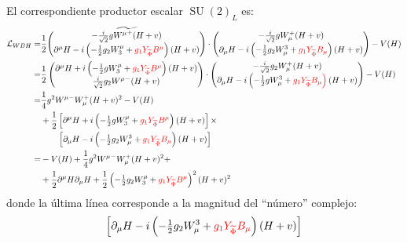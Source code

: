 \begin{frame}
El correspondiente productor escalar $\operatorname{\operatorname{SU}}(2)_L$ es:
\begin{align}
  \mathcal{L}_{WBH}=&\frac{1}{2}\widetilde{\begin{pmatrix}
    -\frac{i}{\sqrt{2}}g{W^\mu}^+(H+v)\\
    \partial^\mu H-i\left(-\frac{1}{2}g_2 W_3^\mu+{\color{red}{g_1}Y_{\widetilde{\Phi}} B^\mu}\right)(H+v)
  \end{pmatrix}}\cdot
   \begin{pmatrix}
    -\frac{i}{\sqrt{2}}gW_\mu^+(H+v)\\
    \partial_\mu H-i\left(-\frac{1}{2}g_2 W^3_\mu+{\color{red}{g_1}Y_{\widetilde{\Phi}} B_\mu}\right)(H+v)
  \end{pmatrix}-V(H)\nonumber\\
=&\frac{1}{2}\begin{pmatrix}
    \partial^\mu H+i\left(-\frac{1}{2}gW_3^\mu+{\color{red}{g_1}Y_{\widetilde{\Phi}} B^\mu}\right)(H+v)\\
    \frac{i}{\sqrt{2}}g_2{W^\mu}^-(H+v)\\
  \end{pmatrix}\cdot
  \begin{pmatrix}
    -\frac{i}{\sqrt{2}}g_2 W_\mu^+(H+v)\\
    \partial_\mu H-i\left(-\frac{1}{2}gW^3_\mu+\color{red}{g_1 Y_{\widetilde{\Phi}} B_\mu}\right)(H+v)
  \end{pmatrix}-V(H)\nonumber\\
  =&\frac{1}{4}g^2{W^\mu}^-W_\mu^+(H+v)^2-V(H)\nonumber\\
  &+\frac{1}{2}\left[\partial^\mu H+i\left(-\tfrac{1}{2}gW_3^\mu+{\color{red}{g_1}Y_{\widetilde{\Phi}} B^\mu}\right)(H+v)\right]
  \times\nonumber\\
  &\qquad\left[\partial_\mu H-i\left(-\tfrac{1}{2}g_2 W^3_\mu+{\color{red}{g_1}Y_{\widetilde{\Phi}} B_\mu}\right)(H+v)\right]\nonumber\\
 =&-V(H)
  +\frac{1}{4}g^2{W^\mu}^-W_\mu^+(H+v)^2+\nonumber\\
  &+\frac{1}{2}\partial^\mu H\partial_\mu H+\frac{1}{2}\left(-\tfrac{1}{2}g_2 W_3^\mu+{\color{red}{g_1}Y_{\widetilde{\Phi}} B^\mu}\right)^2(H+v)^2
\end{align}
donde la última línea corresponde a la magnitud del ``número'' complejo: 
\begin{align}
\left[\partial_\mu H-i\left(-\tfrac{1}{2}g_2 W^3_\mu+{\color{red}{g_1}Y_{\widetilde{\Phi}} B_\mu}\right)(H+v)\right]
\end{align}

\end{frame}

